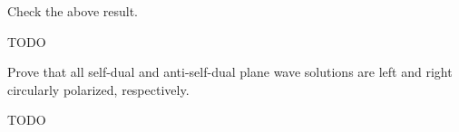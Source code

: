 \documentclass[10pt]{article}
\begin{document}
\begin{example}
	Check the above result.
\end{example}
\sol TODO


\begin{example}
	Prove that all self-dual and anti-self-dual plane wave solutions are left and right circularly polarized, respectively.
\end{example}
\sol TODO
\end{document}
